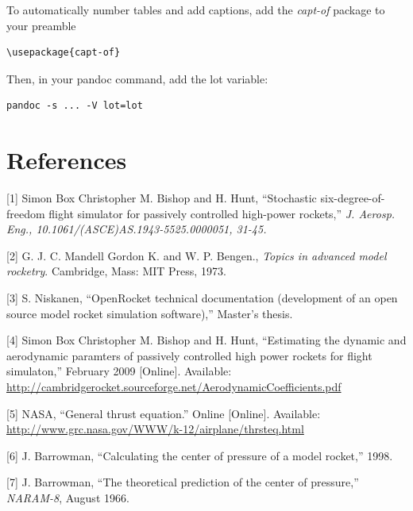 \documentclass[]{article}
\begin{document}
To automatically number tables and add captions, add the \emph{capt-of}
package to your preamble

\begin{verbatim}
\usepackage{capt-of}
\end{verbatim}

Then, in your pandoc command, add the lot variable:

\begin{verbatim}
pandoc -s ... -V lot=lot
\end{verbatim}

\section*{References}\label{references}

{[}1{]} Simon Box Christopher M. Bishop and H. Hunt, ``Stochastic
six-degree-of-freedom flight simulator for passively controlled
high-power rockets,'' \emph{J. Aerosp. Eng.,
10.1061/(ASCE)AS.1943-5525.0000051, 31-45.}

{[}2{]} G. J. C. Mandell Gordon K. and W. P. Bengen., \emph{Topics in
advanced model rocketry}. Cambridge, Mass: MIT Press, 1973.

{[}3{]} S. Niskanen, ``OpenRocket technical documentation (development
of an open source model rocket simulation software),'' Master's thesis.

{[}4{]} Simon Box Christopher M. Bishop and H. Hunt, ``Estimating the
dynamic and aerodynamic paramters of passively controlled high power
rockets for flight simulaton,'' February 2009 {[}Online{]}. Available:
\url{http://cambridgerocket.sourceforge.net/AerodynamicCoefficients.pdf}

{[}5{]} NASA, ``General thrust equation.'' Online {[}Online{]}.
Available: \url{http://www.grc.nasa.gov/WWW/k-12/airplane/thrsteq.html}

{[}6{]} J. Barrowman, ``Calculating the center of pressure of a model
rocket,'' 1998.

{[}7{]} J. Barrowman, ``The theoretical prediction of the center of
pressure,'' \emph{NARAM-8}, August 1966.
\end{document}
